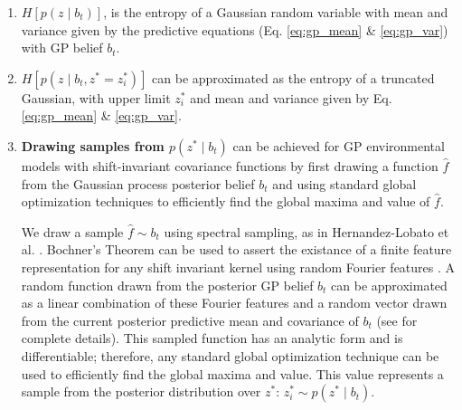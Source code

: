 \documentclass{styles/svproc}
\begin{document}
\begin{enumerate}
    \item  $H[{p}(z \mid  b_t)]$, is the entropy of a Gaussian random variable with mean and variance given by the predictive equations (Eq. \ref{eq:gp_mean} \& \ref{eq:gp_var}) with GP belief $b_t$. %
    \item $H[{p}(z \mid b_t, z^* = z^*_i)]$ can be approximated as the entropy of a truncated Gaussian, with upper limit $z^*_i$ and mean and variance given by Eq. \ref{eq:gp_mean} \& \ref{eq:gp_var}. %
    \item \textbf{Drawing samples from $p(z^* \mid b_t)$} can be achieved for GP environmental models with shift-invariant covariance functions by first drawing a function $\hat{f}$ from the Gaussian process posterior belief $b_t$ and using standard global optimization techniques to efficiently find the global maxima and value of $\hat{f}$. 
    
    \vspace{0.2cm}
    We draw a sample $\hat{f} \sim b_t$ using spectral sampling, as in Hernandez-Lobato et al. \cite{hernandez2014predictive}. Bochner's Theorem can be used to assert the existance of a finite feature representation for any shift invariant kernel using random Fourier features \cite{bochner1959lectures}. A random function drawn from the posterior GP belief $b_t$ can be approximated as a linear combination of these Fourier features and a random vector drawn from the current posterior predictive mean and covariance of $b_t$ (see \cite{hernandez2014predictive} for complete details). This sampled function has an analytic form and is differentiable; therefore, any standard global optimization technique can be used to efficiently find the global maxima and value. This value represents a sample from the posterior distribution over $z^*$: $z^*_i \sim p(z^* \mid b_t)$.
    
\end{enumerate}
\end{document}
